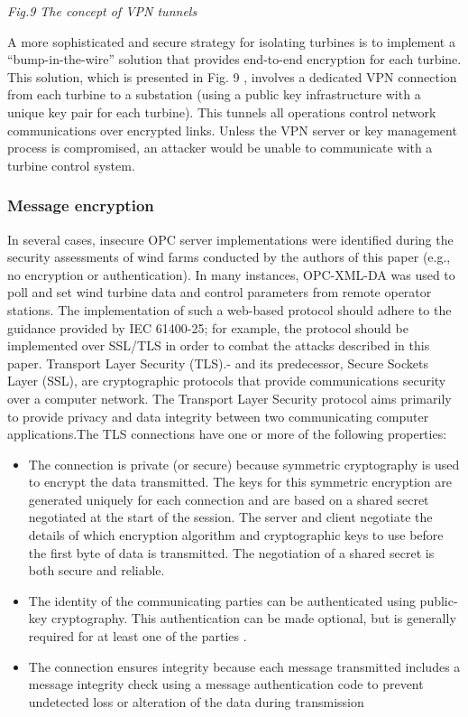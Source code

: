 \documentclass[twosided,a4,10pt]{article}
\begin{document}
\begin{multicols}{2}
\begin{center}
	\textit{Fig.9 The concept of VPN tunnels}
\end{center}
A more sophisticated and secure strategy for isolating turbines is to implement a “bump-in-the-wire” solution that provides end-to-end encryption for each turbine. This solution, which is presented in Fig. 9 , involves a dedicated VPN connection from each turbine to a substation (using a public key infrastructure with a unique key pair 
for each turbine). This tunnels all operations control network communications over encrypted links. Unless the VPN server or key management process is compromised, an attacker would be unable to communicate with a turbine control system. 


\subsubsection{Message encryption}
In several cases, insecure OPC server implementations were identified during the security assessments of wind farms conducted by the authors of this paper (e.g., no encryption or authentication). In many instances, OPC-XML-DA was used to poll and set wind turbine data and control parameters from remote operator stations. The implementation of such a web-based protocol should adhere to the guidance provided by IEC 61400-25; for example, the protocol should be implemented over SSL/TLS in order to combat the attacks described in this paper.
\newline Transport Layer Security (TLS).- and its predecessor, Secure Sockets Layer (SSL), are cryptographic protocols that provide communications security over a computer network. The Transport Layer Security protocol aims primarily to provide privacy and data integrity between two communicating computer applications.The TLS connections have one or more of the following properties:
\begin{itemize}
	\item The connection is private (or secure) because symmetric cryptography is used to encrypt the data transmitted. The keys for this symmetric encryption are generated uniquely for each connection and are based on a shared secret negotiated at the start of the session. The server and client negotiate the details of which encryption algorithm and cryptographic keys to use before the first byte of data is transmitted. The negotiation of a shared secret is both secure and reliable.
	\item The identity of the communicating parties can be authenticated using public-key cryptography. This authentication can be made optional, but is generally required for at least one of the parties .
	\item The connection ensures integrity because each message transmitted includes a message integrity check using a message authentication code to prevent undetected loss or alteration of the data during transmission
\end{itemize}


\end{multicols}
\end{document}
